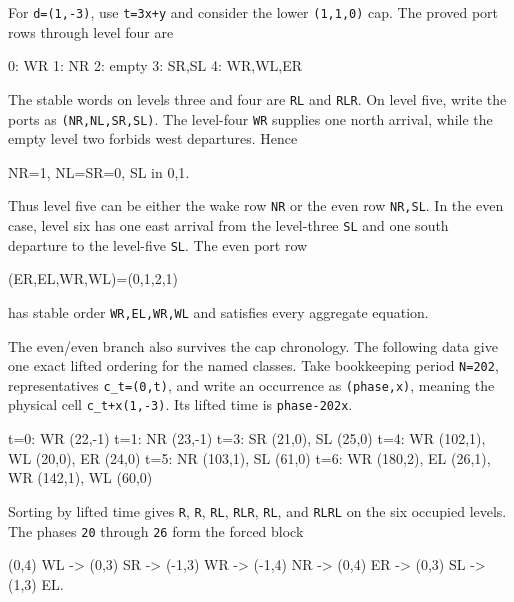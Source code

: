 \documentclass[11pt,letterpaper]{article}
\theoremstyle{plain}
\theoremstyle{definition}
\begin{document}
\begin{NoHyper}
For \texttt{d=(1,-3)}, use \texttt{t=3x+y} and consider the lower \texttt{(1,1,0)} cap. The proved port rows through level four are

\begin{codeblock}
0: WR
1: NR
2: empty
3: SR,SL
4: WR,WL,ER
\end{codeblock}

The stable words on levels three and four are \texttt{RL} and \texttt{RLR}. On level five, write the ports as \texttt{(NR,NL,SR,SL)}. The level-four \texttt{WR} supplies one north arrival, while the empty level two forbids west departures. Hence

\begin{codeblock}
NR=1,       NL=SR=0,       SL in {0,1}.
\end{codeblock}

Thus level five can be either the wake row \texttt{NR} or the even row \texttt{NR,SL}. In the even case, level six has one east arrival from the level-three \texttt{SL} and one south departure to the level-five \texttt{SL}. The even port row

\begin{codeblock}
(ER,EL,WR,WL)=(0,1,2,1)
\end{codeblock}

has stable order \texttt{WR,EL,WR,WL} and satisfies every aggregate equation.

The even/even branch also survives the cap chronology. The following data give one exact lifted ordering for the named classes. Take bookkeeping period \texttt{N=202}, representatives \texttt{c\_t=(0,t)}, and write an occurrence as \texttt{(phase,x)}, meaning the physical cell \texttt{c\_t+x(1,-3)}. Its lifted time is \texttt{phase-202x}.

\begin{codeblock}
t=0: WR (22,-1)
t=1: NR (23,-1)
t=3: SR (21,0), SL (25,0)
t=4: WR (102,1), WL (20,0), ER (24,0)
t=5: NR (103,1), SL (61,0)
t=6: WR (180,2), EL (26,1), WR (142,1), WL (60,0)
\end{codeblock}

Sorting by lifted time gives \texttt{R}, \texttt{R}, \texttt{RL}, \texttt{RLR}, \texttt{RL}, and \texttt{RLRL} on the six occupied levels. The phases \texttt{20} through \texttt{26} form the forced block

\begin{codeblock}
(0,4) WL -> (0,3) SR -> (-1,3) WR -> (-1,4) NR
         -> (0,4) ER -> (0,3) SL -> (1,3) EL.
\end{codeblock}


\end{NoHyper}
\end{document}
